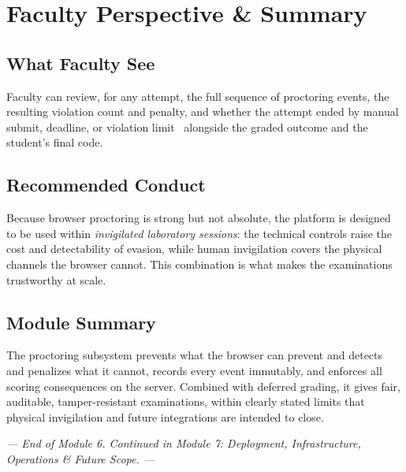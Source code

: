 \documentclass[12pt,a4paper,oneside]{report}
\begin{document}
\chapter{Faculty Perspective \& Summary}
\section{What Faculty See}
Faculty can review, for any attempt, the full sequence of proctoring events, the
resulting violation count and penalty, and whether the attempt ended by manual
submit, deadline, or violation limit \textemdash\ alongside the graded outcome
and the student's final code.

\section{Recommended Conduct}
Because browser proctoring is strong but not absolute, the platform is designed
to be used within \emph{invigilated laboratory sessions}: the technical controls
raise the cost and detectability of evasion, while human invigilation covers the
physical channels the browser cannot. This combination is what makes the
examinations trustworthy at scale.

\section{Module Summary}
The proctoring subsystem prevents what the browser can prevent and detects and
penalizes what it cannot, records every event immutably, and enforces all scoring
consequences on the server. Combined with deferred grading, it gives fair,
auditable, tamper-resistant examinations, within clearly stated limits that
physical invigilation and future integrations are intended to close.

\vspace{0.6cm}
\begin{center}
\textit{--- End of Module 6. Continued in Module 7: Deployment, Infrastructure, Operations \& Future Scope. ---}
\end{center}
\end{document}

